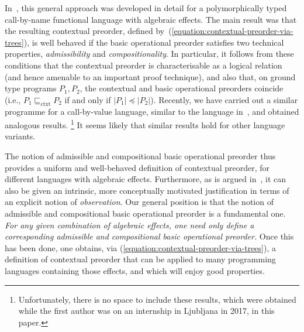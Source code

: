 \documentclass[a4paper,UKenglish]{lipics-v2018}
\newcommand{\Basicleq}{\preccurlyeq}
\theoremstyle{plain}
\begin{document}
In~\cite{gom}, this general approach was developed in detail for 
a polymorphically typed call-by-name functional language with algebraic effects. 
The main result was that the resulting contextual preorder, defined by~(\ref{equation:contextual-preorder-via-trees}), is well behaved if the basic operational preorder satisfies two technical properties, \emph{admissibility} and \emph{compositionality}. In particular, it follows from these conditions that 
the contextual preorder is characterisable as a {logical relation} (and hence amenable to an important proof technique), and also that, on ground type programs $P_1,P_2$,
the contextual and basic operational preorders coincide (i.e., $P_1 \sqsubseteq_\text{ctxt} P_2$ if and only if
$|P_1| \Basicleq |P_2|$). 
Recently, we have carried out a similar programme for a call-by-value language,
similar to the language in~\cite{plotkin2001adequacy}, and obtained analogous results.%
\footnote{\label{footnote:unpublished}Unfortunately, there is no space to include these results, which were obtained while the first author was on an internship in Ljubljana in 2017, in this paper.}
It seems likely that similar results hold for other language variants.



The
notion of admissible and  compositional basic operational preorder thus provides a uniform and well-behaved definition of contextual preorder, for different languages with algebraic effects. Furthermore,
as is argued in~\cite[\S{V}]{gom}, it can also be given an intrinsic, more conceptually motivated justification in terms of an explicit  notion of \emph{observation}. 
Our general position is that the notion of admissible and  compositional basic operational preorder is a fundamental one. 
\emph{For any given combination of algebraic effects, one need only define a corresponding admissible and compositional basic operational preorder.} Once this has been done,  one obtains, via (\ref{equation:contextual-preorder-via-trees}), a definition of contextual preorder that can be applied to many programming languages containing those effects, and which will enjoy good properties.
\end{document}
